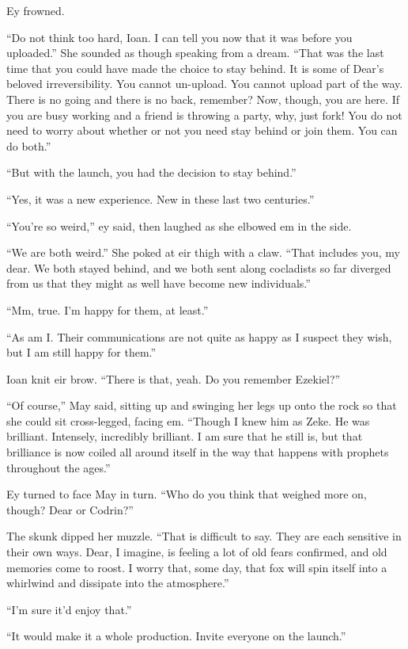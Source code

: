 Ey frowned.

``Do not think too hard, Ioan. I can tell you now that it was before you uploaded.'' She sounded as though speaking from a dream. ``That was the last time that you could have made the choice to stay behind. It is some of Dear's beloved irreversibility. You cannot un-upload. You cannot upload part of the way. There is no going and there is no back, remember? Now, though, you are here. If you are busy working and a friend is throwing a party, why, just fork! You do not need to worry about whether or not you need stay behind or join them. You can do both.''

``But with the launch, you had the decision to stay behind.''

``Yes, it was a new experience. New in these last two centuries.''

``You're so weird,'' ey said, then laughed as she elbowed em in the side.

``We are both weird.'' She poked at eir thigh with a claw. ``That includes you, my dear. We both stayed behind, and we both sent along cocladists so far diverged from us that they might as well have become new individuals.''

``Mm, true. I'm happy for them, at least.''

``As am I. Their communications are not quite as happy as I suspect they wish, but I am still happy for them.''

Ioan knit eir brow. ``There is that, yeah. Do you remember Ezekiel?''

``Of course,'' May said, sitting up and swinging her legs up onto the rock so that she could sit cross-legged, facing em. ``Though I knew him as Zeke. He was brilliant. Intensely, incredibly brilliant. I am sure that he still is, but that brilliance is now coiled all around itself in the way that happens with prophets throughout the ages.''

Ey turned to face May in turn. ``Who do you think that weighed more on, though? Dear or Codrin?''

The skunk dipped her muzzle. ``That is difficult to say. They are each sensitive in their own ways. Dear, I imagine, is feeling a lot of old fears confirmed, and old memories come to roost. I worry that, some day, that fox will spin itself into a whirlwind and dissipate into the atmosphere.''

``I'm sure it'd enjoy that.''

``It would make it a whole production. Invite everyone on the launch.''


